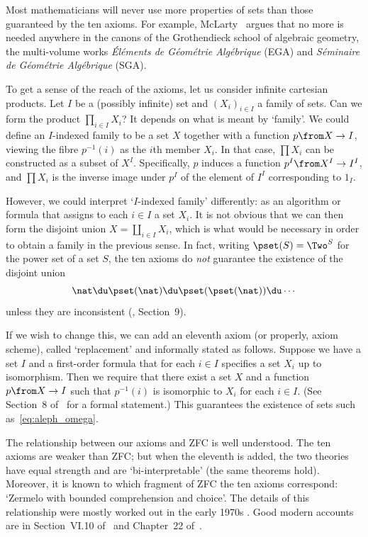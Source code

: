 \documentclass[12pt]{article}
\begin{document}

Most mathematicians will never use more properties of sets than those
guaranteed by the ten axioms.  For example, McLarty~\cite{McLaFOA} argues
that no more is needed anywhere in the canons of the Grothendieck school of
algebraic geometry, the multi-volume works \emph{\'El\'ements de
G\'eom\'etrie Alg\'ebrique} (EGA) and \emph{S\'eminaire de G\'eom\'etrie
Alg\'ebrique} (SGA).

To get a sense of the reach of the axioms, let us consider infinite
cartesian products.  Let $I$ be a (possibly infinite) set and $(X_i)_{i \in
  I}$ a family of sets.  Can we form the product $\prod_{i \in I} X_i$?
It depends on what is meant by `family'.  We could define an
$I$-indexed family to be a set $X$ together with a function $p\from X \to
I$, viewing the fibre $p^{-1}(i)$ as the $i$th member $X_i$.  In that case,
$\prod X_i$ can be constructed as a subset of $X^I$.  Specifically, $p$
induces a function $p^I \from X^I \to I^I$, and $\prod X_i$ is the inverse
image under $p^I$ of the element of $I^I$ corresponding to $1_I$.

However, we could interpret `$I$-indexed family' differently: as an
algorithm or formula that assigns to each $i \in I$ a set $X_i$.  It is not
obvious that we can then form the disjoint union $X = \coprod_{i \in I}
X_i$, which is what would be necessary in order to obtain a family in the
previous sense.  In fact, writing $\pset(S) = \Two^S$ for the power set of
a set $S$, the ten axioms do \emph{not} guarantee the existence of the
disjoint union
% 
\begin{equation}        \label{eq:aleph_omega}
\nat \du \pset(\nat) \du \pset(\pset(\nat)) 
\du \cdots 
\end{equation}
% 
unless they are inconsistent (\cite{MathSML}, Section~9).

If we wish to change this, we can add an eleventh axiom (or properly, axiom
scheme), called `replacement' and informally stated as follows.  Suppose we
have a set $I$ and a first-order formula that for each $i \in I$ specifies
a set $X_i$ up to isomorphism.  Then we require that there exist a set $X$
and a function $p \from X \to I$ such that $p^{-1}(i)$ is isomorphic to
$X_i$ for each $i \in I$.  (See Section~8 of~\cite{McLaECS} for a formal
statement.)  This guarantees the existence of sets such
as~\eqref{eq:aleph_omega}.

The relationship between our axioms and ZFC is well understood.  The ten
axioms are weaker than ZFC; but when the eleventh is added, the two
theories have equal strength and are `bi-interpretable' (the same theorems
hold).  Moreover, it is known to which fragment of ZFC the ten axioms
correspond: `Zermelo with bounded comprehension and choice'.  The details
of this relationship were mostly worked out in the early 1970s
\cite{Cole,MitcBTT,Osiu}.  Good modern accounts are in Section~VI.10
of~\cite{MaMo} and Chapter~22 of~\cite{McLaECET}.
\end{document}
